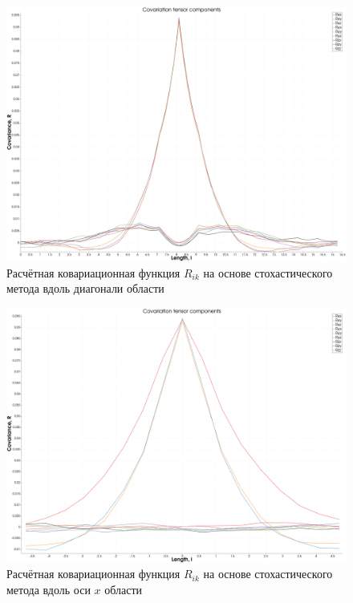 %
%
\begin{figure}[ht] 
  \center
  \includegraphics [width=0.8\linewidth] {images/kriging/3components/calculated_all_diag.png}
  \caption{Расчётная ковариационная функция $R_{ik}$ на основе стохастического метода вдоль диагонали области } 
  \label{img:kriging_covariances_diag}  
\end{figure}

\begin{figure}[ht] 
  \center
  \includegraphics [width=0.8\linewidth] {images/kriging/3components/calculated_all_x.png}
  \caption{Расчётная ковариационная функция $R_{ik}$ на основе стохастического метода вдоль оси $x$ области } 
  \label{img:kriging_covariances_diag}  
\end{figure}

